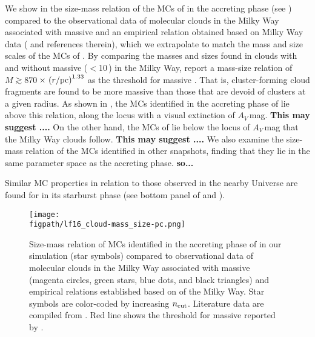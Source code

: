 \documentclass[iop]{emulateapj}
\newcommand{\AP}[1]{({\bf \color{apcolor} AP: #1})}
\begin{document}
We show in  the size-mass relation of the MCs of \flower in the accreting phase (see )
compared to the 
observational data of molecular clouds in the Milky Way associated with massive \SF 
\citep{Beuther02a, Mueller02a, Hill05a, Motte07a} and an empirical relation obtained based on 
Milky Way data (\citealt{Kauffmann10b, Kauffmann10c} and references therein),
which we extrapolate to match the mass and size scales of the MCs of \flower.
By comparing the masses and sizes found in clouds with and without massive \SF ($<$10\,\Msun) 
in the Milky Way, \citet{Kauffmann10c} report a 
mass-size relation of $M \gtrsim 870$\,\Msun$\times\,\left(r/{\rm pc}\right)^{1.33}$ as the threshold for massive \SF. 
That is, cluster-forming cloud fragments are found to be more massive than those that are devoid of clusters 
at a given radius. As shown in , the MCs identified in the accreting phase of \flower lie above this relation, along the locus 
with a visual extinction of $A_V$\,mag. {\bf This may suggest ....}
On the other hand, the MCs of \flower lie below the locus of $A_V$\,mag that the Milky Way clouds follow.
{\bf This may suggest ....}
We also examine the size-mass relation of the MCs identified in other snapshots, finding that they lie in the same 
parameter space as the accreting phase. 
{\bf so...}

Similar MC properties in relation to those observed in the nearby Universe are found for \flower in its starburst phase (see bottom 
panel of  and ).

\begin{figure*}[htbp]
\centering
\texttt{[image: \\figpath/lf16\_cloud-mass\_size-pc.png]}
\caption{
Size-mass relation of MCs identified in the accreting phase of \flower in our simulation (star symbols) 
compared to observational data of molecular clouds in the Milky Way associated with massive \SF 
(magenta circles, green stars, blue dots, and black triangles) and empirical relations 
established based on \obs of the Milky Way.
Star symbols are color-coded by increasing $n_{\rm cut}$.
Literature data are compiled from \citet{Beuther02a, Mueller02a, Hill05a, Motte07a}.
Red line shows the threshold for massive \SF reported by \citet{Kauffmann10b}.
\label{fig:MR}}
\end{figure*}
\end{document}

